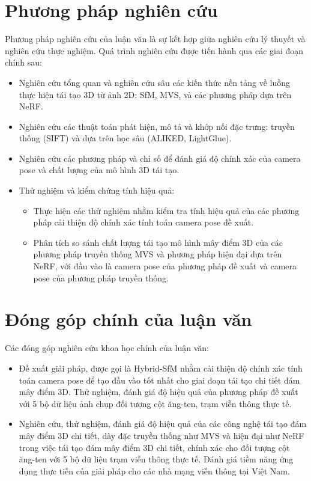\section{Phương pháp nghiên cứu}
Phương pháp nghiên cứu của luận văn là sự kết hợp giữa nghiên cứu lý thuyết và nghiên cứu thực nghiệm. Quá trình nghiên cứu được tiến hành qua các giai đoạn chính sau:
\begin{itemize}
    \item  Nghiên cứu tổng quan và nghiên cứu sâu các kiến thức nền tảng về luồng thực hiện tái tạo 3D từ ảnh 2D: SfM, MVS, và các phương pháp dựa trên NeRF.
    \item Nghiên cứu các thuật toán phát hiện, mô tả và khớp nối đặc trưng: truyền thống (SIFT) và dựa trên học sâu (ALIKED, LightGlue).
    \item Nghiên cứu các phương pháp và chỉ số để đánh giá độ chính xác của camera pose và chất lượng của mô hình 3D tái tạo.
    \item Thử nghiệm và kiểm chứng tính hiệu quả: 
    \begin{itemize}
        \item Thực hiện các thử nghiệm nhằm kiểm tra tính hiệu quả của các phương pháp cải thiện độ chính xác tính toán camera pose đề xuất.
        \item Phân tích so sánh chất lượng tái tạo mô hình mây điểm 3D của các phương pháp truyền thống MVS và phương pháp hiện đại dựa trên NeRF, với đầu vào là camera pose của phương pháp đề xuất và camera pose của phương pháp truyền thống.
    \end{itemize}
   
\end{itemize}

\section{Đóng góp chính của luận văn}
    Các đóng góp nghiên cứu khoa học chính của luận văn:
    \begin{itemize}
        \item Đề xuất giải pháp, được gọi là Hybrid-SfM nhằm cải thiện độ chính xác tính toán camera pose để tạo đầu vào tốt nhất cho giai đoạn tái tạo chi tiết đám mây điểm 3D. Thử nghiệm, đánh giá độ hiệu quả của phương pháp đề xuất với 5 bộ dữ liệu ảnh chụp đối tượng cột ăng-ten, trạm viễn thông thực tế.
        \item Nghiên cứu, thử nghiệm, đánh giá độ hiệu quả của các công nghệ tái tạo đám mây điểm 3D chi tiết, dày đặc truyền thống như MVS và hiện đại như NeRF trong việc tái tạo đám mây điểm 3D chi tiết, chính xác cho đối tượng cột ăng-ten với 5 bộ dữ liệu trạm viễn thông thực tế.  Đánh giá tiềm năng ứng dụng thực tiễn của giải pháp cho các nhà mạng viễn thông tại Việt Nam.
    \end{itemize}